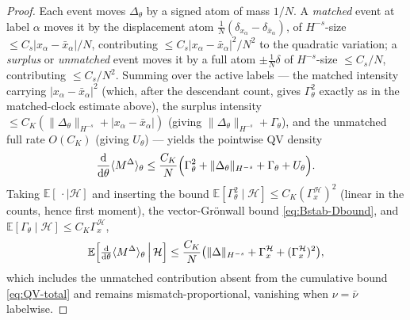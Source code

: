 \documentclass[a4paper,fleqn]{cas-sc}
\theoremstyle{definition}
\theoremstyle{remark}
\begin{document}
\begin{proof}
Each event moves $\Delta_\theta$ by a signed atom of mass $1/N$. A \emph{matched} event
at label $\alpha$ moves it by the displacement atom
$\frac1N(\delta_{x_\alpha}-\delta_{\bar x_\alpha})$, of $H^{-s}$-size
$\le C_s|x_\alpha-\bar x_\alpha|/N$, contributing $\le C_s|x_\alpha-\bar x_\alpha|^2/N^2$
to the quadratic variation; a \emph{surplus} or \emph{unmatched} event moves it by a full
atom $\pm\frac1N\delta$ of $H^{-s}$-size $\le C_s/N$, contributing $\le C_s/N^2$. Summing
over the active labels --- the matched intensity carrying $|x_\alpha-\bar x_\alpha|^2$
(which, after the descendant count, gives $\Gamma_\theta^2$ exactly as in the
matched-clock estimate above), the surplus intensity
$\le C_K(\|\Delta_\theta\|_{H^{-s}}+|x_\alpha-\bar x_\alpha|)$ (giving
$\|\Delta_\theta\|_{H^{-s}}+\Gamma_\theta$), and the unmatched full rate $O(C_K)$ (giving
$U_\theta$) --- yields the pointwise QV density
\begin{equation}\label{eq:Bstab-QVdensity}
\frac{\mathrm d}{\mathrm d\theta}\langle M^\Delta\rangle_\theta
\le\frac{C_K}{N}\Bigl(\Gamma_\theta^2+\|\Delta_\theta\|_{H^{-s}}+\Gamma_\theta+U_\theta\Bigr).
\end{equation}
Taking $\mathbb E[\,\cdot\mid\mathcal H]$ and inserting the bound
$\mathbb E[\Gamma_\theta^2\mid\mathcal H]\le C_K(\Gamma_x^{\mathcal H})^2$ (linear in the
counts, hence first moment), the vector-Gr\"onwall bound \eqref{eq:Bstab-Dbound}, and
$\mathbb E[\Gamma_\theta\mid\mathcal H]\le C_K\Gamma_x^{\mathcal H}$,
\begin{equation}\label{eq:Bstab-QVmean}
\mathbb E\Bigl[\tfrac{\mathrm d}{\mathrm d\theta}\langle M^\Delta\rangle_\theta\,\Big|\,\mathcal H\Bigr]
\le\frac{C_K}{N}\bigl(\|\Delta\|_{H^{-s}}+\Gamma_x^{\mathcal H}+(\Gamma_x^{\mathcal H})^2\bigr),
\end{equation}
which includes the unmatched contribution absent from the cumulative bound
\eqref{eq:QV-total} and remains mismatch-proportional, vanishing when $\nu=\bar\nu$
labelwise.


\end{proof}
\end{document}

